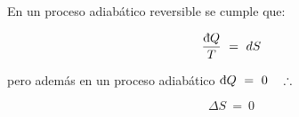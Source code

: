En un proceso adiabático reversible se cumple que:

\begin{equation*}
    \frac{\dbar Q}{T}\ =\ dS
\end{equation*}

pero además en un proceso adiabático $\dbar Q\ =\ 0\ \ \ \therefore$

\begin{equation*}
    \boxed{\Delta S\ =\ 0}
\end{equation*}
